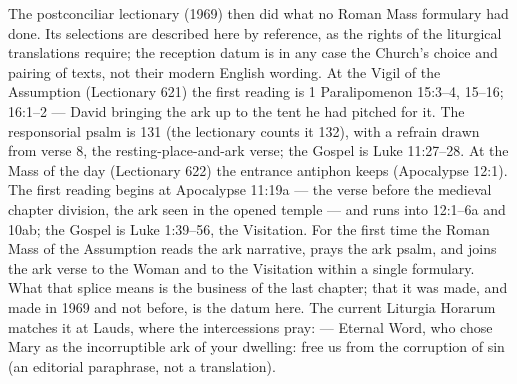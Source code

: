 The postconciliar lectionary (1969) then did what no Roman Mass formulary
had done. Its selections are described here by reference, as the rights of
the liturgical translations require; the reception datum is in any case the
Church's choice and pairing of texts, not their modern English wording. At
the Vigil of the Assumption (Lectionary 621) the first reading is 1
Paralipomenon 15:3--4, 15--16; 16:1--2 --- David bringing the ark up to the
tent he had pitched for it. The responsorial psalm is 131 (the lectionary
counts it 132), with a refrain drawn from verse 8, the
resting-place-and-ark verse; the Gospel is Luke 11:27--28. At the Mass of
the day (Lectionary 622) the entrance antiphon keeps 
(Apocalypse 12:1). The first reading begins at Apocalypse 11:19a --- the
verse before the medieval chapter division, the ark seen in the opened
temple --- and runs into 12:1--6a and 10ab; the Gospel is Luke 1:39--56, the
Visitation. For the first time the Roman Mass of the Assumption reads the
ark narrative, prays the ark psalm, and joins the ark verse to the Woman and
to the Visitation within a single formulary. What that splice means is the
business of the last chapter; that it was made, and made in 1969 and not
before, is the datum here. The current Liturgia Horarum matches it at
Lauds, where the intercessions pray:  --- Eternal Word, who chose Mary as the incorruptible ark of your
dwelling: free us from the corruption of sin (an editorial paraphrase, not a
translation).

